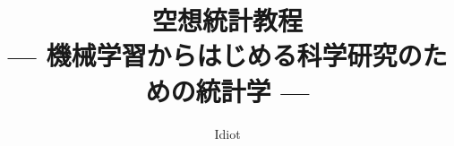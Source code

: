 \documentclass[report,12pt,uplatex,dvipdfmx]{jsbook}
\begin{document}
\title{空想統計教程
\large{\\ --- 機械学習からはじめる科学研究のための統計学 ---}}
\author{Idiot}
\maketitle

\setcounter{tocdepth}{2}
\tableofcontents
%

%
%
%
%


%


\begin{comment}








%





\end{comment}


%












%

%


%


\appendix


%








\end{document}
